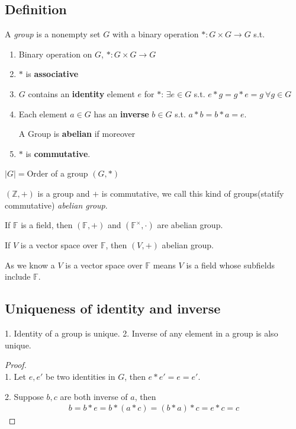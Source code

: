 \documentclass[11pt]{elegantbook}
\begin{document}
\subsection{Definition}
A \textit{group} is a nonempty set $G$ with a binary operation $*:G \times G \rightarrow G$ s.t.
\begin{enumerate}[(1)]
    \item Binary operation on $G$, $*:G \times G \rightarrow G$
    \item $*$ is \textbf{associative}
    \item $G$ contains an \textbf{identity} element $e$ for $*$: $\exists e\in G$ s.t. $e * g = g * e = g\ \forall g \in G$
    \item Each element $a\in G$ has an \textbf{inverse} $b\in G$ s.t. $a*b=b*a=e$.

A Group is \textbf{abelian} if moreover
    \item $*$ is \textbf{commutative}.
\end{enumerate}

$|G|= $Order of a group $(G,*)$

$(\mathbb{Z},+)$ is a group and $+$ is commutative, we call this kind of groups(statify commutative) \textit{abelian group}.
\begin{example}
If $\mathbb{F}$ is a field, then $(\mathbb{F},+)$ and $(\mathbb{F}^{\times},\cdot)$ are abelian group.
\end{example}
\begin{example}
If $V$ is a vector space over $\mathbb{F}$, then $(V,+)$ abelian group.
\end{example}
As we know a $V$ is a vector space over $\mathbb{F}$ means $V$ is a field whose subfields include $\mathbb{F}$.

\subsection{Uniqueness of identity and inverse}
\begin{lemma}
    1. Identity of a group is unique. 2. Inverse of any element in a group is also unique.
\end{lemma}
\begin{proof}
\quad\\
1. Let $e,e'$ be two identities in $G$, then $e*e'=e=e'$.

2. Suppose $b,c$ are both inverse of $a$, then
\begin{equation}
    \begin{aligned}
        b=b*e=b*(a*c)=(b*a)*c=e*c=c
    \end{aligned}
    \nonumber
\end{equation}
\end{proof}
\end{document}
